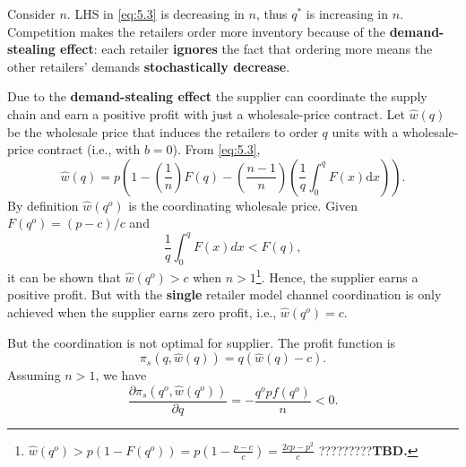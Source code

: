 Consider $n$. LHS in \autoref{eq:5.3} is decreasing in $n$, thus $q^*$ is increasing in $n$. Competition makes the retailers order more inventory because of the \textbf{demand-stealing effect}: each retailer \textbf{ignores} the fact that ordering more means the other retailers' demands \textbf{stochastically decrease}.

Due to the \textbf{demand-stealing effect} the supplier can coordinate the supply chain and earn a positive profit with just a wholesale-price contract.
Let $\hat{w}(q)$ be the wholesale price that induces the retailers to order $q$ units with a wholesale-price contract (i.e., with $b=0$). From \autoref{eq:5.3},
\begin{equation*}
    \hat{w}(q)=p\left(1-\left(\frac{1}{n}\right) F(q)-\left(\frac{n-1}{n}\right)\left(\frac{1}{q} \int_{0}^{q} F(x) \mathrm{d} x\right)\right).
\end{equation*}
By definition $\hat{w}(q^o)$ is the coordinating wholesale price. Given $F(q^o)=(p-c)/c$ and 
\begin{equation*}
    \frac{1}{q}\int_0^q F(x)dx<F(q),
\end{equation*}
it can be shown that $\hat{w}(q^o)>c$ when $n>1$\footnote{
    $\hat{w}(q^o)>p\left(1-F(q^o)\right)=p(1-\frac{p-c}{c})=\frac{2cp-p^2}{c}$ ?????????\textbf{TBD.}
}. Hence, the supplier earns a positive profit. But with the \textbf{single} retailer model channel coordination is only achieved when the supplier earns zero profit, i.e., $\hat{w}(q^o)=c$. 

But the coordination is not optimal for supplier. The profit function is
\begin{equation*}
    \pi_s(q,\hat{w}(q))=q(\hat{w}(q)-c).
\end{equation*}
Assuming $n>1$, we have 
\begin{equation*}
    \frac{\partial\pi_s(q^o,\hat{w}(q^o))}{\partial q}=-\frac{q^o p f(q^o)}{n}<0.
\end{equation*}







